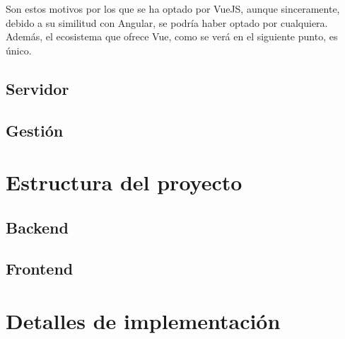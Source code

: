 Son estos motivos por los que se ha optado por VueJS, aunque sinceramente, debido a su similitud con Angular, se podría haber optado por cualquiera. Además, el ecosistema que ofrece Vue, como se verá en el siguiente punto, es único.

\subsection{Servidor}

\subsection{Gestión}

\section{Estructura del proyecto}\label{sec:estructra_proyecto}

\subsection{Backend}

\subsection{Frontend}

\section{Detalles de implementación}\label{sec:detalles_implementacion}